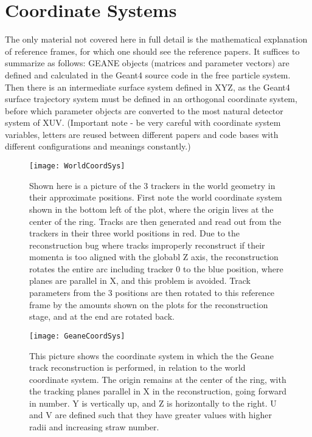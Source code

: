 \section{Coordinate Systems}
\label{sec:Coord}

  The only material not covered here in full detail is the mathematical explanation of reference frames, for which one should see the reference papers. It suffices to summarize as follows: GEANE objects (matrices and parameter vectors) are defined and calculated in the Geant4 source code in the free particle system. Then there is an intermediate surface system defined in XYZ, as the Geant4 surface trajectory system must be defined in an orthogonal coordinate system, before which parameter objects are converted to the most natural detector system of XUV. (Important note - be very careful with coordinate system variables, letters are reused between different papers and code bases with different configurations and meanings constantly.)


\begin{figure}[]
\caption{Shown here is a picture of the 3 trackers in the world geometry in their approximate positions. First note the world coordinate system shown in the bottom left of the plot, where the origin lives at the center of the ring. Tracks are then generated and read out from the trackers in their three world positions in red. Due to the reconstruction bug where tracks improperly reconstruct if their momenta is too aligned with the globabl Z axis, the reconstruction rotates the entire arc including tracker 0 to the blue position, where planes are parallel in X, and this problem is avoided. Track parameters from the 3 positions are then rotated to this reference frame by the amounts shown on the plots for the reconstruction stage, and at the end are rotated back.}
\centering
\texttt{[image: WorldCoordSys]}
\label{fig:WorldCoordSys}
\end{figure}

\begin{figure}[]
\caption{This picture shows the coordinate system in which the the Geane track reconstruction is performed, in relation to the world coordinate system. The origin remains at the center of the ring, with the tracking planes parallel in X in the reconstruction, going forward in number. Y is vertically up, and Z is horizontally to the right. U and V are defined such that they have greater values with higher radii and increasing straw number.}
\centering
\texttt{[image: GeaneCoordSys]}
\label{fig:GeaneCoordSys}
\end{figure}


